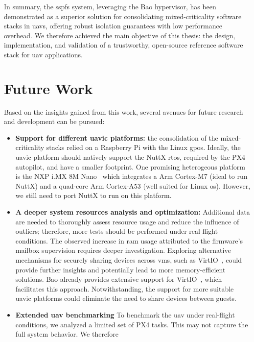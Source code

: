 In summary, the \gls{sspfs} system, leveraging the Bao hypervisor, has been
demonstrated as a superior solution for consolidating mixed-criticality software
stacks in \glspl{uav}, offering robust isolation guarantees with low performance
overhead. We therefore achieved the main objective of this thesis: the design,
implementation, and validation of a trustworthy, open-source reference software
stack for \gls{uav} applications.

\section{Future Work}
Based on the insights gained from this work, several
avenues for future research and development can be
pursued:
\begin{itemize}
\item \textbf{Support for different \gls{uavic} platforms:} the consolidation of
  the mixed-criticality stacks relied on a Raspberry Pi with the Linux
  \gls{gpos}.
  Ideally, the \gls{uavic} platform should natively support the NuttX \gls{rtos},
  required by the PX4 autopilot, and have a smaller footprint. One promising
  heterogeous platform is the NXP i.MX 8M Nano~\cite{imx8mn} which integrates a
  Arm Cortex-M7 (ideal to run NuttX) and a quad-core Arm Cortex-A53 (well suited
  for Linux \gls{os}). However, we still need to port NuttX to run on this
  platform.
\item \textbf{A deeper system resources analysis and optimization:}
  Additional data are needed to thoroughly assess resource usage and reduce the
  influence of outliers; therefore, more tests should be performed under
  real-flight conditions.
  The observed increase
  in \gls{ram} usage attributed to the firmware's mailbox supervision requires
  deeper investigation. Exploring alternative mechanisms for securely sharing
  devices across \glspl{vm}, such as VirtIO~\cite{peixoto-virtio-2024}, could provide further insights and
  potentially lead to more memory-efficient solutions. Bao already provides
  extensive support for
  VirtIO~\cite{costa2022virtio,ribeiro2023virtio,peixoto-virtio-2024,baoRepo},
  which facilitates this approach. Notwithstanding, the support for more
  suitable \gls{uavic} platforms could eliminate the need to share devices
  between guests.
\item \textbf{Extended \gls{uav} benchmarking}
  To benchmark the \gls{uav} under real-flight conditions, we analyzed a limited
  set of PX4 tasks. This may not capture the full system behavior. We therefore

\end{itemize}
